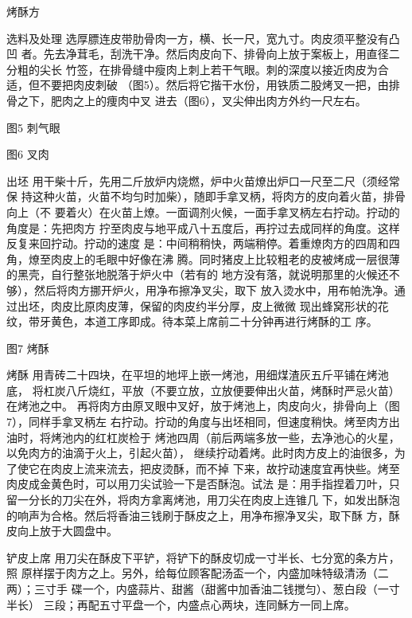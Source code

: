 \begin{recipe}{烤酥方}

\ingredients


\cooking

\step 选料及处理 选厚膘连皮带肋骨肉一方，横、长一尺，宽九寸。肉皮须平整没有凸凹
者。先去净茸毛，刮洗干净。然后肉皮向下、排骨向上放于案板上，用直径二分粗的尖长
竹签，在排骨缝中瘦肉上刺上若干气眼。刺的深度以接近肉皮为合适，但不要把肉皮刺破
（图5）。然后将它揩干水份，用铁质二股烤叉一把，由排骨之下，肥肉之上的痩肉中叉
进去（图6），叉尖伸出肉方外约一尺左右。

图5 刺气眼

图6 叉肉

\step 出坯 用干柴十斤，先用二斤放炉内烧燃，炉中火苗燎出炉口一尺至二尺（须经常保
持这种火苗，火苗不均匀时加柴），随即手拿叉柄，将肉方的皮向着火苗，排骨向上（不
要着火）在火苗上燎。一面调剂火候，一面手拿叉柄左右拧动。拧动的角度是：先把肉方
拧至肉皮与地平成八十五度后，再拧过去成同样的角度。这样反复来回拧动。拧动的速度
是：中间稍稍快，两端稍停。着重燎肉方的四周和四角，燎至肉皮上的毛眼中好像在沸
腾。同时猪皮上比较粗老的皮被烤成一层很薄的黑壳，自行整张地脱落于炉火中（若有的
地方没有落，就说明那里的火候还不够），然后将肉方挪开炉火，用净布擦净叉尖，取下
放入烫水中，用布帕洗净。通过出坯，肉皮比原肉皮薄，保留的肉皮约半分厚，皮上微微
现出蜂窝形状的花纹，带牙黄色，本道工序即成。待本菜上席前二十分钟再进行烤酥的工
序。

图7 烤酥

\step 烤酥 用青砖二十四块，在平坦的地坪上嵌一烤池，用细煤渣灰五斤平铺在烤池底，
将杠炭八斤烧红，平放（不要立放，立放便要伸出火苗，烤酥时严忌火苗）在烤池之中。
再将肉方由原叉眼中叉好，放于烤池上，肉皮向火，排骨向上（图7），同样手拿叉柄左
右拧动。拧动的角度与出坯相同，但速度稍快。烤至肉方出油时，将烤池内的红杠炭检于
烤池四周（前后两端多放一些，去净池心的火星，以免肉方的油滴于火上，引起火苗），
继续拧动着烤。此时肉方皮上的油很多，为了使它在肉皮上流来流去，把皮烫酥，而不掉
下来，故拧动速度宜再快些。烤至肉皮成金黄色时，可以用刀尖试验一下是否酥泡。试法
是：用手指捏着刀叶，只留一分长的刀尖在外，将肉方拿离烤池，用刀尖在肉皮上连锥几
下，如发出酥泡的响声为合格。然后将香油三钱刷于酥皮之上，用净布擦净叉尖，取下酥
方，酥皮向上放于大圆盘中。

\step 铲皮上席 用刀尖在酥皮下平铲，将铲下的酥皮切成一寸半长、七分宽的条方片，照
原样摆于肉方之上。另外，给每位顾客配汤盃一个，内盛加味特级清汤\footnotemark（二
两）；三寸手 碟一个，内盛蒜片、甜酱（甜酱中加香油二钱搅匀）、葱白段（一寸半长）
三段；再配五寸平盘一个，内盛点心两块，连同穌方一同上席。


\end{recipe}
